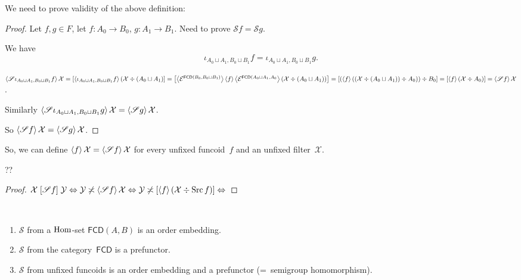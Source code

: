 We need to prove validity of the above definition:

\begin{proof}
Let $f,g\in F$, let $f:A_0\to B_0$, $g:A_1\to B_1$.
Need to prove $\mathscr{S}f=\mathscr{S}g$.

We have
\[\iota_{A_0\sqcup A_1,B_0\sqcup B_1}f=\iota_{A_0\sqcup A_1,B_0\sqcup B_1}g.\]

$\left\langle \mathscr{S}\iota_{A_0\sqcup A_1,B_0\sqcup B_1}f\right\rangle\mathcal{X}=
[\left\langle \iota_{A_0\sqcup A_1,B_0\sqcup B_1}f\right\rangle(\mathcal{X}\div(A_0\sqcup A_1)]=
\left[\left\langle \mathcal{E}^{\mathsf{FCD}(B_0,B_0\sqcup B_1)}\right\rangle\left\langle f\right\rangle\left\langle \mathcal{E}^{\mathsf{FCD}(A_0\sqcup A_1,A_0}\right\rangle(\mathcal{X}\div(A_0\sqcup A_1))\right]=
[(\left\langle f\right\rangle((\mathcal{X}\div(A_0\sqcup A_1))\div A_0))
\div B_0]=
[\left\langle f\right\rangle(\mathcal{X}\div A_0)]=
\left\langle \mathscr{S}f\right\rangle\mathcal{X}$.

Similarly
$\left\langle \mathscr{S}\iota_{A_0\sqcup A_1,B_0\sqcup B_1}g\right\rangle\mathcal{X}=
\left\langle \mathscr{S}g\right\rangle\mathcal{X}$.

So $\left\langle \mathscr{S}f\right\rangle\mathcal{X}=
\left\langle \mathscr{S}g\right\rangle\mathcal{X}$.
\end{proof}

\begin{defn}
So, we can define $\left\langle f\right\rangle\mathcal{X}=\left\langle \mathscr{S}f\right\rangle\mathcal{X}$ for every unfixed funcoid~$f$ and an unfixed filter~$\mathcal{X}$.
\end{defn}

\begin{prop}
??
\end{prop}

\begin{proof}
$\mathcal{X}\mathrel{\left[\mathscr{S}f\right]}\mathcal{Y}\Leftrightarrow
\mathcal{Y}\not\asymp\left\langle \mathscr{S}f\right\rangle\mathcal{X}
\Leftrightarrow
\mathcal{Y}\not\asymp [\left\langle f\right\rangle(\mathcal{X}\div\operatorname{Src} f)]
\Leftrightarrow$
\end{proof}

\begin{prop}\label{s-fcd}
~
\begin{enumerate}
\item\label{s-fcd-hom} $\mathscr{S}$ from a $\operatorname{Hom}$-set $\mathsf{FCD}(A,B)$
is an order embedding.
\item\label{s-fcd-fctr} $\mathscr{S}$ from the category~$\mathsf{FCD}$
is a prefunctor.
\item\label{s-fcd-unfix} $\mathscr{S}$ from unfixed funcoids is an order embedding and a prefunctor (=~semigroup homomorphism).
\end{enumerate}
\end{prop}

